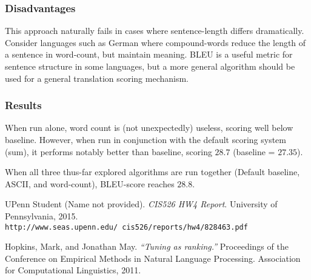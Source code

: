 \documentclass{article}
\begin{document}
\subsubsection{Disadvantages}
This approach naturally fails in cases where sentence-length differs dramatically. Consider languages such as German where compound-words reduce the length of a sentence in word-count, but maintain meaning. BLEU is a useful metric for sentence structure in some languages, but a more general algorithm should be used for a general translation scoring mechanism.

\subsubsection{Results}
When run alone, word count is (not unexpectedly) useless, scoring well below baseline. However, when run in conjunction with the default scoring system (sum), it performs notably better than baseline, scoring $28.7$ (baseline = $27.35$).

When all three thus-far explored algorithms are run together (Default baseline, ASCII, and word-count), BLEU-score reaches $28.8$.


\medskip

\begin{thebibliography}{9}
UPenn Student (Name not provided).
\textit{CIS526 HW4 Report}.
University of Pennsylvania, 2015. \texttt{http://www.seas.upenn.edu/~cis526/reports/hw4/828463.pdf}

Hopkins, Mark, and Jonathan May. \textit{``Tuning as ranking.''}
Proceedings of the Conference on Empirical Methods in Natural Language Processing. Association for Computational Linguistics, 2011.

\end{thebibliography}
\end{document}
